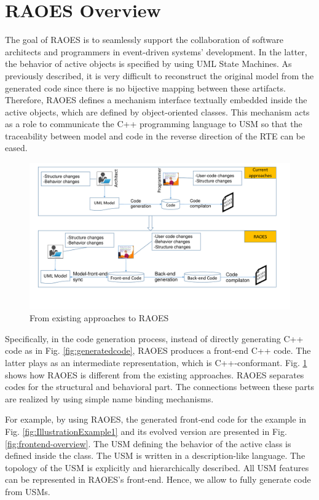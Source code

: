 \section{RAOES Overview}
\label{sec:overview}
The goal of RAOES is to seamlessly support the collaboration of software architects and programmers in event-driven systems' development.
In the latter, the behavior of active objects is specified by using UML State Machines.
As previously described, it is very difficult to reconstruct the original model from the generated code since there is no bijective mapping between these artifacts.
Therefore, RAOES defines a mechanism interface textually embedded inside the active objects, which are defined by object-oriented classes. 
This mechanism acts as a role to communicate the C++ programming language to USM so that the traceability between model and code in the reverse direction of the RTE can be eased.

\begin{figure}
	\centering
	\includegraphics[clip, trim=0.6cm 2.8cm 1.4cm 0.5cm, width=1.0\columnwidth]{figures/frontend}
	\caption{From existing approaches to RAOES} 
	\label{fig:raoes}
\end{figure}

Specifically, in the code generation process, instead of directly generating C++ code as in Fig. \ref{fig:generatedcode}, RAOES produces a front-end C++ code.
The latter plays as an intermediate representation, which is C++-conformant.
Fig. \ref{fig:raoes} shows how RAOES is different from the existing approaches.
RAOES separates codes for the structural and behavioral part.
The connections between these parts are realized by using simple name binding mechanisms.

For example, by using RAOES, the generated front-end code for the example in Fig. \ref{fig:IllustrationExample1} and its evolved version are presented in Fig. \ref{fig:frontend-overview}.
The USM defining the behavior of the active class  is defined inside the class.
The USM is written in a description-like language.
The topology of the USM is explicitly and hierarchically described.
All USM features can be represented in RAOES's front-end.
Hence, we allow to fully generate code from USMs.


